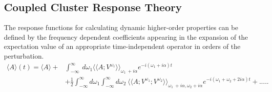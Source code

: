\subsection{Coupled Cluster Response Theory}
The response functions for calculating dynamic higher-order properties 
can be defined by the frequency dependent coefficients appearing in the 
expansion of the expectation value of an appropriate time-independent 
operator in orders of the perturbation.\cite{koch90}
\\
\begin{equation}
\begin{split}
\langle A \rangle (t) = \langle A \rangle + & \int_{-\infty}^{\infty}\
d\omega_1{\langle\langle A;V^{\omega_1}\rangle\rangle}_{\omega_1  \
+ i\alpha}e^{-i(\omega_1 + i\alpha)t} \\
& + \frac{1}{2} \int_{-\infty}^{\infty}d\omega_1\int_{-\infty}^{\infty}d\omega_2\
{\langle\langle A;V^{\omega_1};V^{\omega_2}\rangle\rangle}_{\omega_1 \
+ i\alpha,\omega_2 + i\alpha}e^{-i(\omega_1 + \omega_2 + 2i\alpha)t} + .....
\end{split}
\end{equation}
\\

